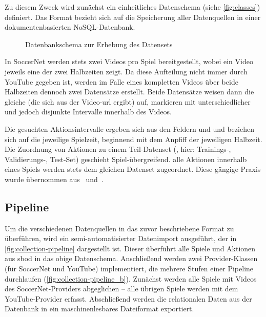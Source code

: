 Zu diesem Zweck wird zunächst ein einheitliches Datenschema (siehe \autoref{fig:classes}) definiert.
Das Format bezieht sich auf die Speicherung aller Datenquellen in einer dokumentenbasierten NoSQL-Datenbank.

\begin{figure}
    \centering
    \caption{Datenbankschema zur Erhebung des Datensets}
    \label{fig:classes}
\end{figure}

In SoccerNet werden stets zwei Videos pro Spiel bereitgestellt, wobei ein Video jeweils eine der zwei Halbzeiten zeigt.
Da diese Aufteilung nicht immer durch YouTube gegeben ist, werden im Falle eines kompletten Videos über beide Halbzeiten dennoch zwei Datensätze erstellt.
Beide Datensätze weisen dann die gleiche  (die sich aus der Video-\gls{url} ergibt) auf, markieren mit unterschiedlicher  und  jedoch disjunkte Intervalle innerhalb des Videos.

Die gesuchten Aktionsintervalle ergeben sich aus den Feldern  und  und beziehen sich auf die jeweilige Spielzeit, beginnend mit dem Anpfiff der jeweiligen Halbzeit.
Die Zuordnung von Aktionen zu einem Teil-Datenset (, hier: Trainings-, Validierungs-, Test-Set) geschieht Spiel-übergreifend.
\Dh alle Aktionen innerhalb eines Spiels werden stets dem gleichen Datenset zugeordnet.
Diese gängige Praxis wurde übernommen aus~\cite{Giancola18} und~\cite{Jiang19}.

\subsection{Pipeline}
\label{subsec:pipeline}

Um die verschiedenen Datenquellen in das zuvor beschriebene Format zu überführen, wird ein semi-automatisierter Datenimport ausgeführt, der in \autoref{fig:collection-pipeline} dargestellt ist.
Dieser überführt alle Spiele und Aktionen aus \gls{sbod} in das obige Datenschema.
Anschließend werden zwei Provider-Klassen (für SoccerNet und YouTube) implementiert, die mehrere Stufen einer Pipeline durchlaufen (\autoref{fig:collection-pipeline_b}).
Zunächst werden alle Spiele mit Videos des SoccerNet-Providers abgeglichen -- alle übrigen Spiele werden mit dem YouTube-Provider erfasst.
Abschließend werden die relationalen Daten aus der Datenbank in ein maschinenlesbares Dateiformat exportiert.

